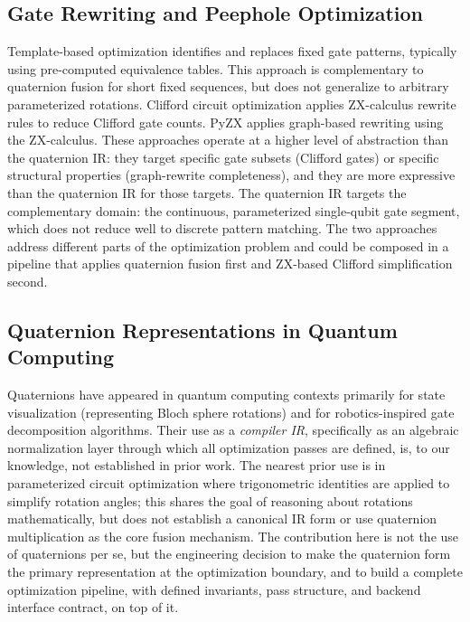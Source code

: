 \documentclass[conference]{IEEEtran}
\begin{document}
\subsection{Gate Rewriting and Peephole Optimization}

Template-based optimization \cite{b8} identifies and replaces fixed gate patterns,
typically using pre-computed equivalence tables. This approach is complementary to
quaternion fusion for short fixed sequences, but does not generalize to arbitrary
parameterized rotations. Clifford circuit optimization \cite{b6,b7} applies ZX-calculus
rewrite rules to reduce Clifford gate counts. PyZX \cite{b9} applies graph-based rewriting
using the ZX-calculus. These approaches operate at a higher level of abstraction than
the quaternion IR: they target specific gate subsets (Clifford gates) or specific
structural properties (graph-rewrite completeness), and they are more expressive than
the quaternion IR for those targets. The quaternion IR targets the complementary domain:
the continuous, parameterized single-qubit gate segment, which does not reduce well to
discrete pattern matching. The two approaches address different parts of the optimization
problem and could be composed in a pipeline that applies quaternion fusion first and
ZX-based Clifford simplification second.

\subsection{Quaternion Representations in Quantum Computing}

Quaternions have appeared in quantum computing contexts primarily for state visualization
(representing Bloch sphere rotations) and for robotics-inspired gate decomposition
algorithms. Their use as a \textit{compiler IR}, specifically as an algebraic normalization
layer through which all optimization passes are defined, is, to our knowledge, not
established in prior work. The nearest prior use is in parameterized circuit optimization
where trigonometric identities are applied to simplify rotation angles; this shares the
goal of reasoning about rotations mathematically, but does not establish a canonical
IR form or use quaternion multiplication as the core fusion mechanism. The contribution
here is not the use of quaternions per se, but the engineering decision to make the
quaternion form the primary representation at the optimization boundary, and to build
a complete optimization pipeline, with defined invariants, pass structure, and
backend interface contract, on top of it.
\end{document}
